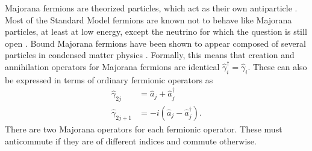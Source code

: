 Majorana fermions are theorized particles, which act as their own antiparticle  \cite{Majorana1937, Majorana2006}. Most of the Standard  Model fermions are known not to behave like Majorana particles, at least at low energy, except the neutrino for which the question is still open \cite{Kayser2009, Baha2019, Hirsch2018, Bilenky2020}. Bound Majorana fermions have been shown to appear composed of several particles in condensed matter physics \cite{Wilczek2009}. Formally, this means that creation and annihilation operators for Majorana fermions are identical $\hat{\gamma}_i^{\dagger} = \hat{\gamma}_i$. These can also be expressed in terms of ordinary fermionic operators as
\begin{equation} \label{eq:majorana}
\begin{aligned}
\hat{\gamma}_{2j} &= \hat{a}_j + \hat{a}^\dagger_j\\
\hat{\gamma}_{2j + 1} &= -i(\hat{a}_j - \hat{a}^\dagger_j).
\end{aligned}
\end{equation}
There are two Majorana operators for each fermionic operator. These must anticommute if they are of different indices and commute otherwise.  

